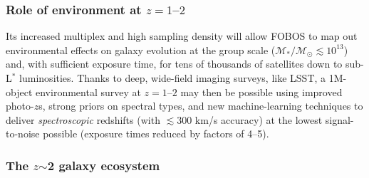 \subsubsection{Role of environment at $z=1$--$2$ }

Its increased multiplex and high sampling density will allow FOBOS to
map out environmental effects on galaxy evolution at the group scale
($\mathcal{M_\ast/M_\odot} \lesssim 10^{13}$) and, with sufficient
exposure time, for tens of thousands of satellites down to sub-L$^*$
luminosities. Thanks to deep, wide-field imaging surveys, like LSST,
a 1M-object environmental survey at $z=1$--$2$ may then be possible
using improved photo-$z$s, strong priors on spectral types, and new
machine-learning techniques to deliver {\it spectroscopic} redshifts
(with $\lesssim$300 km/s accuracy) at the lowest signal-to-noise
possible (exposure times reduced by factors of 4--5).




\subsubsection{The $z$$\sim$2 galaxy ecosystem}
\label{sec:z2galaxies}

